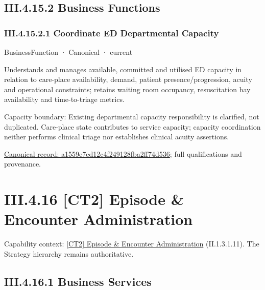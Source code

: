 \subsection*{III.4.15.2 Business Functions}
\label{navigation:III.4.15.2}

\subsubsection*{III.4.15.2.1 Coordinate ED Departmental Capacity}
\label{navigation:III.4.15.2.1}

\label{element:a1559e7ed12c4f249128fba2ff74d536}
{\small BusinessFunction · Canonical · current}\par

Understands and manages available, committed and utilised ED capacity in relation to care-place availability, demand, patient presence/progression, acuity and operational constraints; retains waiting room occupancy, resuscitation bay availability and time-to-triage metrics.



Capacity boundary: Existing departmental capacity responsibility is clarified, not duplicated. Care-place state contributes to service capacity; capacity coordination neither performs clinical triage nor establishes clinical acuity assertions.


{\footnotesize \href{../../../../continuum/business/business-function/a1559e7ed12c4f249128fba2ff74d536.md}{Canonical record: a1559e7ed12c4f249128fba2ff74d536}; full qualifications and provenance.}\par
\section*{III.4.16 [CT2] Episode \& Encounter Administration}
\label{navigation:III.4.16}

{\small Capability context: \hyperref[element:61d7067aee0540259b3daca4287d66d2]{[CT2] Episode \& Encounter Administration} (II.1.3.1.11). The Strategy hierarchy remains authoritative.}\par
\subsection*{III.4.16.1 Business Services}
\label{navigation:III.4.16.1}


